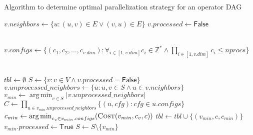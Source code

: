 \documentclass{article}
\DeclareMathOperator*{\argmin}{arg\,min}
\newcommand{\true}{\textsf{True}}
\newcommand{\false}{\textsf{False}}
\begin{document}
\begin{algorithm}
\caption{\label{alg:findoptstrategy}Algorithm to determine optimal parallelization
strategy for an operator DAG}

\begin{algorithmic}[1]

		\State $v.neighbors \leftarrow  \{u: (u,v) \in E \lor (v,u) \in E\}$
		\State $v.processed \leftarrow \false$

		\\
		\State $v.configs \leftarrow \{(c_1, c_2,\dots,c_{v.dim}):
		\forall_{i\in[1,v.dim]}c_i\in \mathbb{Z^*}\land \prod_{i\in [1,v.dim]} c_i \le
		nprocs\}$
	\EndFor

	\\

	\State $tbl \leftarrow \emptyset$
	\State $S \leftarrow \{v: v\in V \land v.processed = \false\}$ 
			\State $v.unprocessed\_neighbors \leftarrow \{u: u, v\in S \land u\in v.neighbors\}$
		\EndFor
		\State $v_{min} \leftarrow \argmin_{v\in S} |v.unprocessed\_neighbors|$
		\\

		\State $C \leftarrow \prod_{u\in v_{min}.unprocessed\_neighbors} \{(u,
		cfg): cfg \in u.configs\}$
		\\

			\State $c_{min} \leftarrow \argmin_{c_v \in v_{min}.configs}
			(\Call{Cost}{v_{min}, c_v, c})$ 
			\State $tbl \leftarrow tbl \cup \{(v_{min}, c, c_{min})\}$
		\EndFor
		\\


		\State $v_{min}.processed \leftarrow \true$
		\State $S \leftarrow S\setminus \{v_{min}\}$
	\EndWhile
	\\
	\\
	 

	\EndProcedure
\end{algorithmic}

\end{algorithm}
\end{document}
